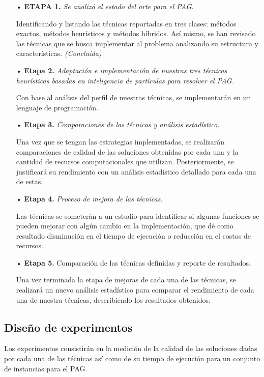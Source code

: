 \documentclass[letterpaper,10pt]{article}
\begin{document}
 \begin{itemize}
 \item[•] \textbf{ETAPA 1.} \emph{Se analizó el estado del arte para el PAG.}
\item[] Identificando y listando las técnicas reportadas en tres clases: métodos exactos, métodos heurísticos y métodos híbridos. Así mismo, se han revisado las técnicas que se busca implementar al problema analizando su estructura y características.
\emph{(Concluida)}

\item[•] \textbf{Etapa 2.} \emph{Adaptación e implementación de nuestras tres técnicas heurísticas basadas en inteligencia de partículas para resolver el PAG.}

\item[] Con base al análisis del perfil de nuestras técnicas, se implementarán en un lenguaje de programación.
        
\item[•] \textbf{Etapa 3.} \emph{Comparaciones de las técnicas y análisis estadístico.}

\item [] Una vez que se tengan las estrategias implementadas, se realizarán comparaciones de calidad de las soluciones obtenidas por cada una y la cantidad de recursos computacionales  que utilizan. Posteriormente, se justificará su rendimiento con un análisis estadístico detallado para cada  una de estas.

\item[•] \textbf{Etapa 4.} \emph{Proceso de mejora de las técnicas.}

\item[] Las técnicas se someterán a un estudio para identificar si algunas funciones se pueden mejorar con algún cambio en la implementación, que dé como resultado disminución en el tiempo de ejecución o reducción en el costos de recursos.


\item[•] \textbf{Etapa 5.} Comparación de las técnicas definidas y reporte de resultados.

\item[] Una vez terminada la etapa de mejoras de cada una de las técnicas, se realizará un nuevo análisis estadístico para comparar el rendimiento de cada una de nuestra técnicas, describiendo los resultados obtenidos.
        
  \end{itemize}

\subsection{\textbf{Diseño de experimentos}}
Los experimentos consistirán en la medición de la calidad de las soluciones dadas por cada una de las técnicas así como de su tiempo de ejecución para un conjunto de instancias para el PAG.
         
\end{document}

